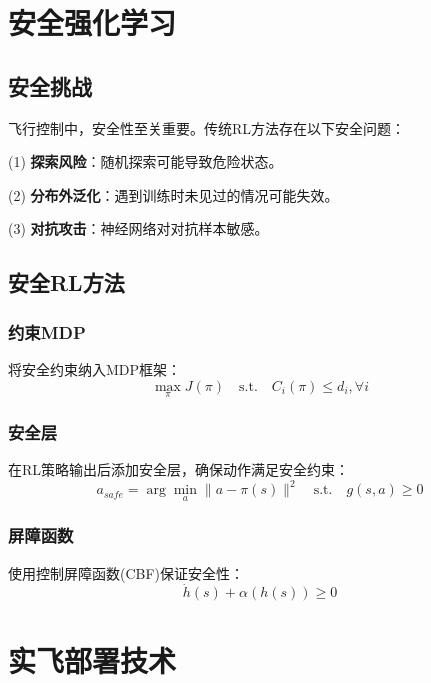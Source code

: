 \section{安全强化学习}\label{sec:safe_rl}

\subsection{安全挑战}

飞行控制中，安全性至关重要。传统RL方法存在以下安全问题：

(1) \textbf{探索风险}：随机探索可能导致危险状态。

(2) \textbf{分布外泛化}：遇到训练时未见过的情况可能失效。

(3) \textbf{对抗攻击}：神经网络对对抗样本敏感。

\subsection{安全RL方法}

\subsubsection{约束MDP}

将安全约束纳入MDP框架：
\begin{equation}
\max_\pi J(\pi) \quad \text{s.t.} \quad C_i(\pi) \leq d_i, \forall i
\end{equation}

\subsubsection{安全层}

在RL策略输出后添加安全层，确保动作满足安全约束：
\begin{equation}
a_{safe} = \arg\min_a \|a - \pi(s)\|^2 \quad \text{s.t.} \quad g(s,a) \geq 0
\end{equation}

\subsubsection{屏障函数}

使用控制屏障函数(CBF)保证安全性：
\begin{equation}
\dot{h}(s) + \alpha(h(s)) \geq 0
\end{equation}

\section{实飞部署技术}\label{sec:deployment}

